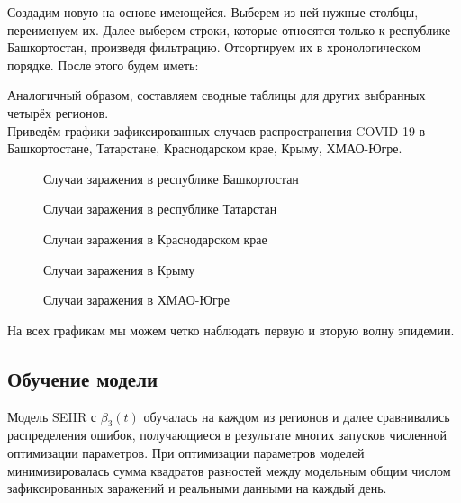 \documentclass{article}
\begin{document}
\noindent Создадим новую на основе имеющейся. Выберем из ней нужные столбцы, переименуем их. Далее выберем строки, которые относятся только к республике Башкортостан, произведя фильтрацию. Отсортируем их в хронологическом порядке. После этого будем иметь: 

\begin{figure}[H]
	\label{fig:image}
\end{figure}
 
\noindent Аналогичный образом, составляем сводные таблицы для других выбранных четырёх регионов.\\

\noindent Приведём графики зафиксированных случаев распространения COVID-19 в Башкортостане, Татарстане, Краснодарском крае, Крыму, ХМАО-Югре.

\begin{figure}[H]
    \caption{Случаи заражения в республике Башкортостан}
	\label{fig:image}
\end{figure}

\begin{figure}[H]
    \caption{Случаи заражения в республике Татарстан}
	\label{fig:image}
\end{figure}

\begin{figure}[H]
    \caption{Случаи заражения в Краснодарском крае}
	\label{fig:image}
\end{figure}

\begin{figure}[H]
    \caption{Случаи заражения в Крыму}
	\label{fig:image}
\end{figure}

\begin{figure}[H]
    \caption{Случаи заражения в ХМАО-Югре}
	\label{fig:image}
\end{figure}

\noindent На всех графикам мы можем четко наблюдать первую и вторую волну эпидемии.

\subsection{Обучение модели}
\noindent Модель SEIIR с $\beta_3(t)$ обучалась на каждом из регионов и далее сравнивались распределения ошибок, получающиеся в результате многих запусков численной оптимизации параметров. При оптимизации параметров моделей минимизировалась сумма квадратов разностей между модельным общим числом зафиксированных заражений и реальными данными на каждый день.\\
\end{document}
